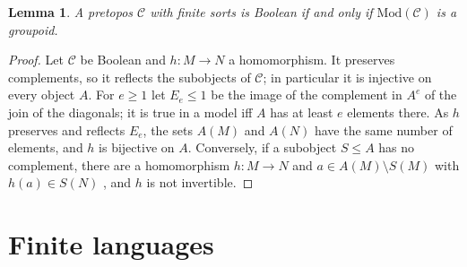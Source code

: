 \documentclass[11pt]{amsart}
\newtheorem{lem}[thm]{Lemma}
\theoremstyle{definition}
\newcommand{\Mod}{\mathrm{Mod}}
\newcommand{\cC}{\mathcal C}
\begin{document}
\begin{lem}\label{lem:boolean}
A pretopos $\cC$ with finite sorts is Boolean if and only if
$\Mod(\cC)$ is a groupoid.
\end{lem}
\begin{proof}
Let $\cC$ be Boolean and $h\colon M\to N$ a homomorphism. It preserves
complements, so it reflects the subobjects of $\cC$; in particular it
is injective on every object $A$. For $e\ge1$ let $E_e\le1$ be the
image of the complement in $A^e$ of the join of the diagonals; it is
true in a model iff $A$ has at least $e$ elements there. As $h$
preserves and reflects $E_e$, the sets $A(M)$ and $A(N)$ have the same
number of elements, and $h$ is bijective on $A$. Conversely, if a
subobject $S\le A$ has no complement, there are a homomorphism
$h\colon M\to N$ and $a\in A(M)\setminus S(M)$ with $h(a)\in S(N)$
\cite[Lemma~4.1]{Heyting}, and $h$ is not invertible.
\end{proof}

\section{Finite languages}\label{sec:approx}
\end{document}

